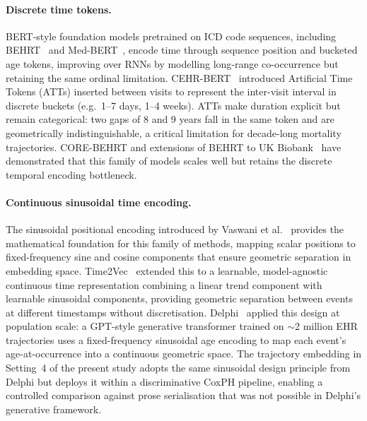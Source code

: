 \paragraph{Discrete time tokens.}
BERT-style foundation models pretrained on ICD code sequences, including BEHRT~\cite{behrt}
and Med-BERT~\cite{medbert}, encode time through sequence position and bucketed age tokens,
improving over RNNs by modelling long-range co-occurrence but retaining the same ordinal
limitation.
CEHR-BERT~\cite{cehrbert} introduced Artificial Time Tokens (ATTs) inserted between visits
to represent the inter-visit interval in discrete buckets (e.g.\ 1--7 days, 1--4 weeks).
ATTs make duration explicit but remain categorical: two gaps of 8 and 9 years fall in the
same token and are geometrically indistinguishable, a critical limitation for decade-long
mortality trajectories.
CORE-BEHRT and extensions of BEHRT to UK Biobank~\cite{behrtukb} have demonstrated that
this family of models scales well but retains the discrete temporal encoding bottleneck.

\paragraph{Continuous sinusoidal time encoding.}
The sinusoidal positional encoding introduced by Vaswani et al.~\cite{vaswani2017attention}
provides the mathematical foundation for this family of methods, mapping scalar positions
to fixed-frequency sine and cosine components that ensure geometric separation in embedding
space.
Time2Vec~\cite{time2vec} extended this to a learnable, model-agnostic continuous time
representation combining a linear trend component with learnable sinusoidal components,
providing geometric separation between events at different timestamps without discretisation.
Delphi~\cite{delphi2024} applied this design at population scale: a GPT-style
generative transformer trained on $\sim$2 million EHR trajectories uses a fixed-frequency
sinusoidal age encoding to map each event's age-at-occurrence into a continuous geometric
space.
The trajectory embedding in Setting~4 of the present study adopts the same sinusoidal design
principle from Delphi but deploys it within a discriminative CoxPH pipeline, enabling a
controlled comparison against prose serialisation that was not possible in Delphi's generative
framework.

